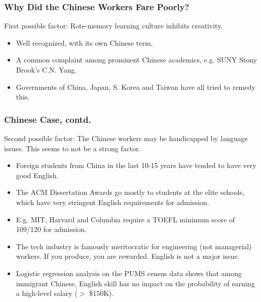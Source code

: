 \documentclass{beamer}
\begin{document}
\begin{frame}
\frametitle{Why Did the Chinese Workers Fare Poorly?}

\pause

First possible factor:  Rote-memory learning culture inhibits
creativity.

\pause

\begin{itemize}

\item Well recognized, with its own Chinese term,
\pause

\item A common complaint among prominent Chinese academics, e.g. SUNY
Stony Brook's C.N. Yang. \pause

\item Governments of China, Japan, S. Korea and Taiwan have all tried to
remedy this.

\end{itemize}

\end{frame}

\begin{frame}
\frametitle{Chinese Case, contd.}

\pause

Second possible factor:  The Chinese workers may be handicapped by language
issues.
\pause
This seems to not be a strong factor.

\pause

\begin{itemize}

\item Foreign students from China in the last 10-15 years have tended to
have very good English. \pause

\item The ACM Dissertation Awards go mostly to students at the elite
schools, which have very stringent English requirements for admission.
\pause

\item E.g. MIT, Harvard and Columbia require a TOEFL minimum score of
109/120 for admission. \pause

\item The tech industry is famously meritocratic for engineering (not
managerial) workers.  If you produce, you are rewarded.  English is not
a major issue. \pause

\item Logistic regression analysis on the PUMS census data shows that among
immigrant Chinese, English skill has no impact on the probability of
earning a high-level salary ($>$ \$150K). 

\end{itemize}

\end{frame}
\end{document}
